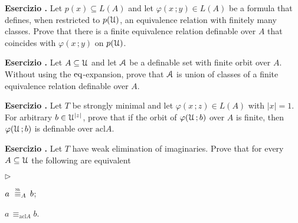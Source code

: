 \documentclass[10pt]{article}
\def\phi{\varphi}
\def\Aa{\EuScript A}
\def\U{\EuScript U}
\def\acl{\textrm{acl}}
\def\eq{{\rm eq}}
\def\equivSh{\stackrel{\smash{\scalebox{.5}{\rm Sh}}}{\equiv}}
\newcommand{\labella}[1]{{\sf\footnotesize #1}\hfill}
\renewenvironment{itemize}
  {\begin{list}{$\triangleright$}{%
   \setlength{\parskip}{0mm}
   \setlength{\topsep}{0mm}
   \setlength{\rightmargin}{0mm}
   \setlength{\listparindent}{0mm}
   \setlength{\itemindent}{0mm}
   \setlength{\labelwidth}{3ex}
   \setlength{\itemsep}{0mm}
   \setlength{\parsep}{0mm}
   \setlength{\partopsep}{0mm}
   \setlength{\labelsep}{1ex}
   \setlength{\leftmargin}{\labelwidth+\labelsep}
   \let\makelabel\labella}}{%
   \end{list}}
\newcounter{ex}
\newenvironment{exercise}{\clearpage\addtocounter{ex}{1}\textbf{Esercizio \theex.\quad}}{}
\begin{document}
\clearpage%
\rhead{}


\begin{exercise}
Let $p( x)\subseteq L(A)$ and let $\phi( x\,; y)\in L(A)$ be a formula that defines, when restricted to $p(\U)$, an equivalence relation with finitely many classes.
Prove that there is a finite equivalence relation definable over $A$ that coincides with $\phi( x\,; y)$ on $p(\U)$.
\end{exercise}

\begin{exercise}\label{ex_feqthm_senza_eq}
Let $A\subseteq\U$ and let $\Aa$ be a definable set with finite orbit over $A$.
Without using the $\eq$-expansion, prove that $\Aa$ is union of classes of a finite equivalence relation definable over $A$.
\end{exercise}

\begin{exercise}
Let $T$ be strongly minimal and let $\phi( x\,; z)\in L(A)$ with $| x|=1$.
For arbitrary $ b\in\U^{| z|}$, prove that if the orbit of $\phi(\U\,;  b)$ over $A$ is finite, then $\phi(\U\,;  b)$ is definable over $\acl A$.
\end{exercise}

\begin{exercise}
  Let $T$ have weak elimination of imaginaries.
  Prove that for every $A\subseteq\U$ the following are equivalent
  \begin{itemize}
  \item[1.]  $a\ \equivSh_A\, b$;
  \item[2.]  $a\,\equiv_{\acl A}b$.
  \end{itemize} 
\end{exercise}
\end{document}
